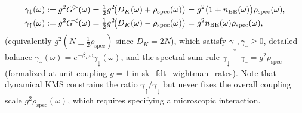 \documentclass[11pt,a4paper]{article}
\theoremstyle{definition}
\theoremstyle{remark}
\newcommand{\1}{\mathbf{1}}
\newcommand{\code}[1]{{\scriptsize\ttfamily #1}}
\begin{document}
\begin{enumerate}
  \begin{align}
    \gamma_\downarrow(\omega) &:= g^2 G^>(\omega) = \tfrac{1}{2}g^2\!\bigl(D_K(\omega)+\rho_{\mathrm{spec}}(\omega)\bigr) = g^2\bigl(1 + n_{\mathrm{BE}}(\omega)\bigr)\rho_{\mathrm{spec}}(\omega), \notag\\
    \gamma_\uparrow(\omega) &:= g^2 G^<(\omega) = \tfrac{1}{2}g^2\!\bigl(D_K(\omega)-\rho_{\mathrm{spec}}(\omega)\bigr) = g^2 n_{\mathrm{BE}}(\omega)\rho_{\mathrm{spec}}(\omega), \label{eq:wightman-rates}
  \end{align}
  (equivalently $g^2(N\pm\frac{1}{2}\rho_{\mathrm{spec}})$ since $D_K=2N$), which satisfy $\gamma_\downarrow, \gamma_\uparrow \ge 0$, detailed balance $\gamma_\uparrow(\omega) = e^{-\beta_H \omega}\gamma_\downarrow(\omega)$, and the spectral sum rule $\gamma_\downarrow - \gamma_\uparrow = g^2\rho_{\mathrm{spec}}$ (formalized at unit coupling $g=1$ in \code{sk\_\allowbreak fdt\_\allowbreak wightman\_\allowbreak rates}). Note that dynamical KMS constrains the ratio $\gamma_\uparrow/\gamma_\downarrow$ but never fixes the overall coupling scale $g^2\rho_{\mathrm{spec}}(\omega)$, which requires specifying a microscopic interaction.
\end{enumerate}
\end{document}
